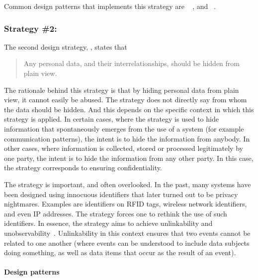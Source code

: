Common design patterns that implements this strategy are ~\cite{jacobs2005select} ,  and ~\cite{pfitzmann2010privacy-terminology}.

\subsubsection{Strategy \#2: } 



The second design strategy, , states that 
\begin{quote}
Any personal data, and their interrelationships, should be hidden from plain view. 
\end{quote}
The rationale behind this strategy is that by hiding personal data from plain view, it cannot easily be abused. The strategy does not directly say from whom the data should be hidden. And this depends on the specific context in which this strategy is applied. In certain cases, where the strategy is used to hide information that spontaneously emerges from the use of a system (for example communication patterns), the intent is to hide the information from anybody. In other cases, where information is collected, stored or processed legitimately by one party, the intent is to hide the information from any other party. In this case, the strategy corresponds to ensuring confidentiality. 

The  strategy is important, and often overlooked. In the past, many systems have been designed using innocuous identifiers that later turned out to be privacy nightmares. Examples are identifiers on RFID tags, wireless network identifiers, and even IP addresses. The  strategy forces one to rethink the use of such identifiers. In essence, the  strategy aims to achieve unlinkability and unobservability~\cite{pfitzmann2010privacy-terminology}. Unlinkability in this context ensures that two events cannot be related to one another (where events can be understood to include data subjects doing something, as well as data items that occur as the result of an event). 

\paragraph{Design patterns}

